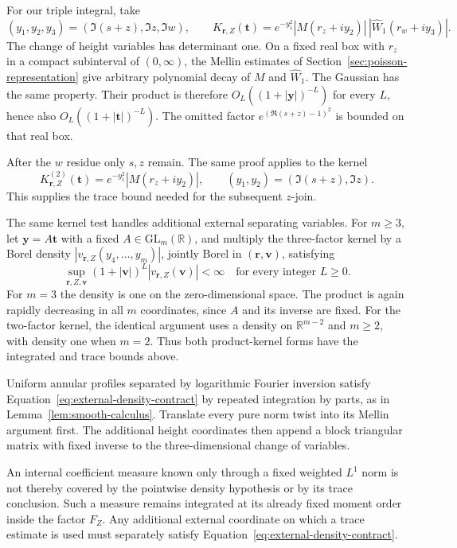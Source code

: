 \documentclass[11pt,a4paper]{article}
\numberwithin{equation}{section}
\numberwithin{figure}{section}
\theoremstyle{definition}
\theoremstyle{remark}
\begin{document}
For our triple integral, take
\[
 (y_1,y_2,y_3)=(\Im(s+z),\Im z,\Im w),\qquad
 K_{\boldsymbol r,Z}(\boldsymbol t)
 =e^{-y_1^2}|M(r_z+iy_2)|\,|\widehat W_1(r_w+iy_3)|.
\]
The change of height variables has determinant one.  On a fixed real box
with $r_z$ in a compact subinterval of $(0,\infty)$, the Mellin estimates of
Section~\ref{sec:poisson-representation} give arbitrary polynomial decay of $M$ and
$\widehat W_1$.  The Gaussian has the same property.  Their product is
therefore $O_L((1+|\boldsymbol y|)^{-L})$ for every $L$, hence also
$O_L((1+|\boldsymbol t|)^{-L})$.  The omitted factor
$e^{(\Re(s+z)-1)^2}$ is bounded on that real box.

After the $w$ residue only $s,z$ remain.  The same proof applies to the
kernel
\begin{equation}
 K^{(2)}_{\boldsymbol r,Z}(\boldsymbol t)
 =e^{-y_1^2}|M(r_z+iy_2)|,
 \qquad(y_1,y_2)=(\Im(s+z),\Im z).
 \label{eq:external-two-dimensional-kernel}
\end{equation}
This supplies the trace bound needed for the subsequent $z$-join.

The same kernel test handles additional external separating variables.
For $m\ge3$, let $\boldsymbol y=A\boldsymbol t$ with a fixed
$A\in\mathrm{GL}_m(\mathbb R)$, and multiply the three-factor kernel by a
Borel density $|v_{\boldsymbol r,Z}(y_4,\ldots,y_m)|$, jointly Borel in
$(\boldsymbol r,\boldsymbol v)$, satisfying
\begin{equation}
 \sup_{\boldsymbol r,Z,\boldsymbol v}
 (1+|\boldsymbol v|)^L|v_{\boldsymbol r,Z}(\boldsymbol v)|<\infty
 \quad\text{for every integer }L\ge0.
 \label{eq:external-density-contract}
\end{equation}
For $m=3$ the density is one on the zero-dimensional space.  The product is
again rapidly decreasing in all $m$ coordinates, since $A$ and its inverse
are fixed.  For the two-factor kernel, the identical argument uses a density
on $\mathbb R^{m-2}$ and $m\ge2$, with density one when $m=2$.
Thus both product-kernel forms have the integrated and trace bounds above.

Uniform annular profiles separated by logarithmic Fourier inversion
satisfy Equation~\eqref{eq:external-density-contract} by repeated
integration by parts, as in Lemma~\ref{lem:smooth-calculus}.  Translate every
pure norm twist into its Mellin argument first.  The additional height
coordinates then append a block triangular matrix with fixed inverse to
the three-dimensional change of variables.

An internal coefficient measure known only through a fixed weighted $L^1$
norm is not thereby covered by the pointwise density hypothesis or by its
trace conclusion.  Such a measure remains integrated at its already fixed
moment order inside the factor $F_Z$.  Any additional external coordinate
on which a trace estimate is used must separately satisfy
Equation~\eqref{eq:external-density-contract}.
\end{document}
